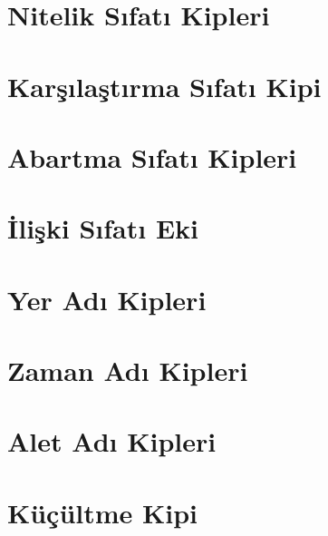 
\section{Nitelik Sıfatı Kipleri}

\section{Karşılaştırma Sıfatı Kipi}

\section{Abartma Sıfatı Kipleri}

\section{İlişki Sıfatı Eki}

\section{Yer Adı Kipleri}

\section{Zaman Adı Kipleri}

\section{Alet Adı Kipleri}

\section{Küçültme Kipi}






